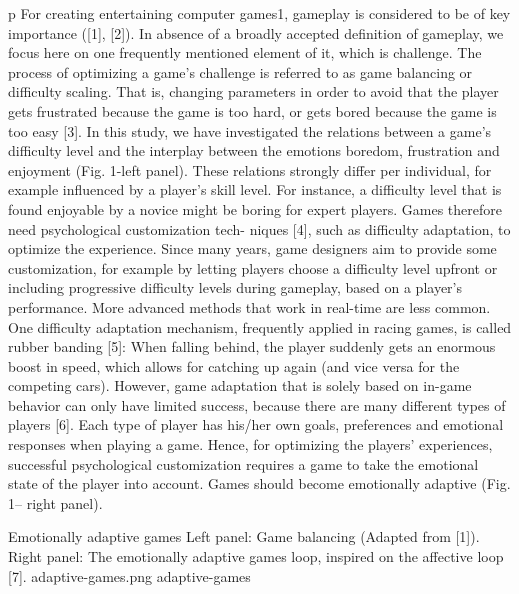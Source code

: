 \documentclass{uofsthesis-cs}
\begin{document}
p For creating entertaining computer games1, gameplay is considered to be of key importance ([1], [2]). In absence of a broadly accepted definition of gameplay, we focus here on one frequently mentioned element of it, which is challenge. The process of optimizing a game’s challenge is referred to as game balancing or difficulty scaling. That is, changing parameters in order to avoid that the player gets frustrated because the game is too hard, or gets bored because the game is too easy [3]. In this study, we have investigated the relations between a game's difficulty level and the interplay between the emotions boredom, frustration and enjoyment (Fig. 1-left panel). These 
relations strongly differ per individual, for example influenced by a player's skill level. For instance, a difficulty level that is found enjoyable by a novice might be boring for expert players. Games therefore need psychological customization tech- niques [4], such as difficulty adaptation, to optimize the experience. Since many years, game designers aim to provide some customization, for example by letting players choose a difficulty level upfront or including progressive difficulty levels during gameplay, based on a player’s performance.   More advanced methods that work in real-time are less common. One difficulty adaptation mechanism, frequently applied in racing games, is called rubber banding [5]: When falling behind, the player suddenly gets an enormous boost in speed, which allows for catching up again (and vice versa for the competing cars). However, game adaptation that is solely based on in-game behavior can only have limited success, because there are many different types of players [6]. Each type of player has his/her own goals, preferences and emotional responses when playing a game. Hence, for optimizing the players' experiences, successful psychological customization requires a game to take the emotional state of the player into account. Games should become emotionally adaptive (Fig. 1– right panel). 

\img
{Emotionally adaptive games}
{Left panel: Game balancing (Adapted from [1]). Right panel: The emotionally adaptive games loop, inspired on the affective loop [7]. }
{adaptive-games.png}
{adaptive-games}
\end{document}
